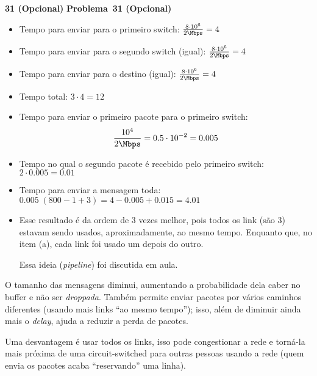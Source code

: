 \documentclass{article}
\newcounter{exe-list}
\newenvironment{exe-list}
    {\begin{list}{\alph{exe-list}.}{\usecounter{exe-list}}}
    {\end{list}}
\newenvironment{exe}[2][Problema]
    {\newcommand{\opt}{(Opcional)}%
    \newcommand{\sketch}[1]{{\bfseries Rascunho:} ##1}%
    \medskip\par\noindent\ifthenelse{\equal{#1}{}}
        {\textbf{\large #2}}
        {\textbf{\large #1~#2}}%
    \medskip\par\noindent}
    {\medskip}
\begin{document}
\begin{exe}{31 \opt}
    \begin{exe-list}
    \item \begin{itemize}
            \item Tempo para enviar para o primeiro switch:
                \( \frac{8 \cdot 10^6}{2 \Mbps} = 4 \)
            \item Tempo para enviar para o segundo switch (igual):
                \( \frac{8 \cdot 10^6}{2 \Mbps} = 4 \)
            \item Tempo para enviar para o destino (igual):
                \( \frac{8 \cdot 10^6}{2 \Mbps} = 4 \)
            \item Tempo total:
                \( 3 \cdot 4 = 12 \)
        \end{itemize}
    \item \begin{itemize}
            \item Tempo para enviar o primeiro pacote
                para o primeiro switch:
                \[
                    \frac{10^4}{2 \Mbps} = 0.5 \cdot 10^{-2}
                    = 0.005
                \]
            \item Tempo no qual o segundo pacote
                é recebido pelo primeiro switch:
                \( 2 \cdot 0.005 = 0.01 \)
        \end{itemize}
    \item \begin{itemize}
            \item Tempo para enviar a mensagem toda:
                \(
                    0.005 \; (800 - 1 + 3)
                    = 4 - 0.005 + 0.015
                    = 4.01
                \)
            \item Esse resultado é da ordem de \(3\) vezes melhor,
                pois todos os link (são 3)
                estavam sendo usados, aproximadamente,
                ao mesmo tempo.
                Enquanto que, no item (a),
                cada link foi usado um depois do outro.

                Essa ideia (\emph{pipeline}) foi discutida em aula.
        \end{itemize}
    \item O tamanho das mensagens diminui,
        aumentando a probabilidade dela caber no buffer
        e não ser \emph{droppada}.
        Também permite enviar pacotes por vários caminhos diferentes
        (usando mais links ``ao mesmo tempo'');
        isso, além de diminuir ainda mais o \emph{delay},
        ajuda a reduzir a perda de pacotes.
    \item Uma desvantagem é usar todos os links,
        isso pode congestionar a rede e torná-la mais próxima
        de uma circuit-switched para outras pessoas usando a rede
        (quem envia os pacotes acaba ``reservando'' uma linha).
    \end{exe-list}
\end{exe}
\end{document}
